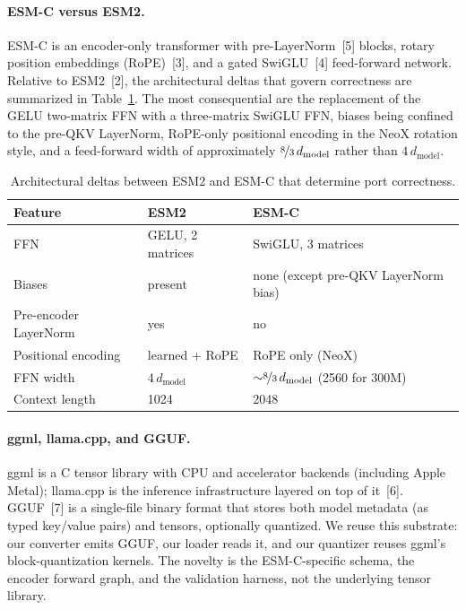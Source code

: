\documentclass{article}
\begin{document}
\paragraph{ESM-C versus ESM2.}
ESM-C is an encoder-only transformer with pre-LayerNorm~[5] blocks, rotary position embeddings (RoPE)~[3], and a gated SwiGLU~[4] feed-forward network. Relative to ESM2~[2], the architectural deltas that govern correctness are summarized in Table~\ref{tab:esm2-vs-esmc}. The most consequential are the replacement of the GELU two-matrix FFN with a three-matrix SwiGLU FFN, biases being confined to the pre-QKV LayerNorm, RoPE-only positional encoding in the NeoX rotation style, and a feed-forward width of approximately $\nicefrac{8}{3}\,d_{\text{model}}$ rather than $4\,d_{\text{model}}$.

\begin{table}
  \caption{Architectural deltas between ESM2 and ESM-C that determine port correctness.}
  \label{tab:esm2-vs-esmc}
  \centering
  \begin{tabular}{lll}
    \toprule
    Feature & ESM2 & ESM-C \\
    \midrule
    FFN & GELU, 2 matrices & SwiGLU, 3 matrices \\
    Biases & present & none (except pre-QKV LayerNorm bias) \\
    Pre-encoder LayerNorm & yes & no \\
    Positional encoding & learned + RoPE & RoPE only (NeoX) \\
    FFN width & $4\,d_{\text{model}}$ & ${\sim}\nicefrac{8}{3}\,d_{\text{model}}$ (2560 for 300M) \\
    Context length & 1024 & 2048 \\
    \bottomrule
  \end{tabular}
\end{table}

\paragraph{ggml, llama.cpp, and GGUF.}
ggml is a C tensor library with CPU and accelerator backends (including Apple Metal); llama.cpp is the inference infrastructure layered on top of it~[6]. GGUF~[7] is a single-file binary format that stores both model metadata (as typed key/value pairs) and tensors, optionally quantized. We reuse this substrate: our converter emits GGUF, our loader reads it, and our quantizer reuses ggml's block-quantization kernels. The novelty is the ESM-C-specific schema, the encoder forward graph, and the validation harness, not the underlying tensor library.
\end{document}
